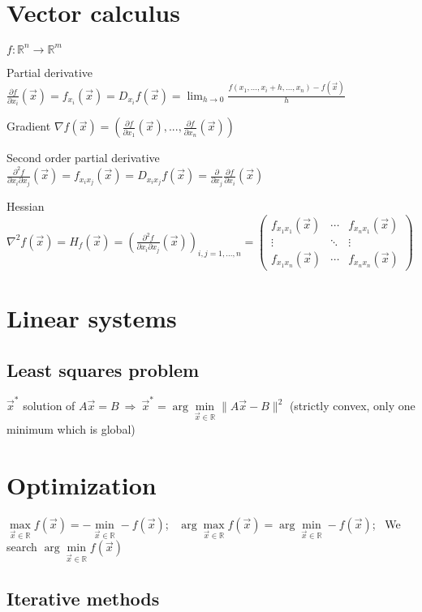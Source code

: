 \documentclass[]{article}
\newcommand{\cfi}[1]{f_{x_{#1}}(\vec{x})}
\newcommand{\pfi}[1]{\frac{\partial f}{\partial x_{#1}}(\vec{x})}
\newcommand{\dfi}[1]{D_{x_{#1}}f(\vec{x})}
\newcommand{\scfi}[2]{f_{x_{#1}x_{#2}}(\vec{x})}
\newcommand{\spfi}[2]{\frac{\partial^2 f}{\partial x_{#1} \partial x_{#2}}(\vec{x})}
\newcommand{\sdfi}[2]{D_{x_{#1}x_{#2}}f(\vec{x})}
\begin{document}
	\section{Vector calculus}
	
	$f : \mathbb{R}^n \to \mathbb{R}^m$
	
	Partial derivative $\pfi{i}=\cfi{i}=\dfi{i}=\lim_{h\to 0}{\frac{f(x_{1},...,x_{i}+h,...,x_{n})-f(\vec{x})}{h}}$
	
	Gradient $\nabla f(\vec{x}) = \left(\pfi{1},...,\pfi{n}\right)$

	Second order partial derivative $\spfi{i}{j}=\scfi{i}{j}=\sdfi{i}{j}=\frac{\partial}{\partial x_{j}}\pfi{i}$
	
	Hessian $\nabla^2 f(\vec{x}) = H_{f}(\vec{x})=\left(\spfi{i}{j}\right)_{i,j=1,...,n} = \begin{pmatrix}
		\scfi{1}{1} & \cdots & \scfi{n}{1} \\
		\vdots & \ddots & \vdots \\
		\scfi{1}{n} & \cdots & \scfi{n}{n}
	\end{pmatrix}$


	\section{Linear systems}
	
	
	\subsection{Least squares problem}
	
	$\vec{x}^*$ solution of $A \vec{x} = B \ \Rightarrow \ \vec{x}^* = \arg\min\limits_{\vec{x}\in \mathbb{R}}\lVert A \vec{x} - B \rVert^2$ (strictly convex, only one minimum which is global)
	
	\section{Optimization}
	
	$\max\limits_{\vec{x}\in\mathbb{R}} f(\vec{x}) = -\min\limits_{\vec{x}\in\mathbb{R}} -f(\vec{x})$; \ 
	$\arg\max\limits_{\vec{x}\in\mathbb{R}} f(\vec{x}) = \arg\min\limits_{\vec{x}\in\mathbb{R}} -f(\vec{x})$; \ 
	We search $\arg\min\limits_{\vec{x}\in\mathbb{R}} f(\vec{x})$
	
	\subsection{Iterative methods}
	
\end{document}

